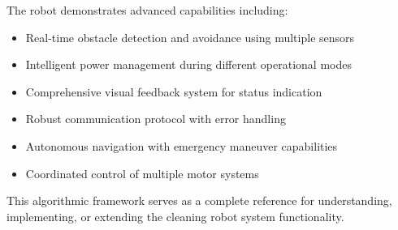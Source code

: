 \documentclass[12pt]{article}
\begin{document}
The robot demonstrates advanced capabilities including:
\begin{itemize}
    \item Real-time obstacle detection and avoidance using multiple sensors
    \item Intelligent power management during different operational modes
    \item Comprehensive visual feedback system for status indication
    \item Robust communication protocol with error handling
    \item Autonomous navigation with emergency maneuver capabilities
    \item Coordinated control of multiple motor systems
\end{itemize}

This algorithmic framework serves as a complete reference for understanding, implementing, or extending the cleaning robot system functionality.
\end{document}
